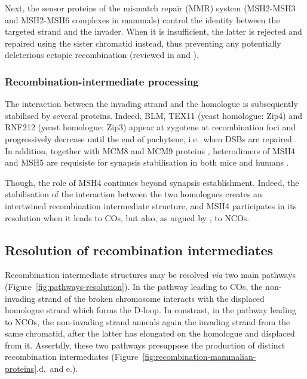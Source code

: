 Next, the sensor proteins of the mismatch repair (MMR) system (MSH2-MSH3 and MSH2-MSH6 complexes in mammals) control the identity between the targeted strand and the invader.
When it is insufficient, the latter is rejected and repaired using the sister chromatid instead, thus preventing any potentially deleterious ectopic recombination (reviewed in \citealp{surtees2004mismatch} and \citealp{goldfarb2010frequent}).


\subsubsection{Recombination-intermediate processing}
The interaction between the invading strand and the homologue is subsequently stabilised by several proteins.
Indeed, BLM, TEX11 (yeast homologue: Zip4) and RNF212 (yeast homologue: Zip3) appear at zygotene at recombination foci and progressively decrease until the end of pachytene, i.e.\ when DSBs are repaired \citep[reviewed in][]{baudat2013meiotic}. 
In addition, together with MCM8 and MCM9 proteins \citep{lutzmann2012mcm8}, heterodimers of MSH4 and MSH5 \citep{scully1997association} are requisiste for synapsis stabilisation in both mice \citep{devries1999mouse,kneitz2000muts} and humans \citep{snowden2004hmsh4hmsh5}.

Though, the role of MSH4 continues beyond synapsis establishment. 
Indeed, the stabilisation of the interaction between the two homologues creates an intertwined recombination intermediate structure, and MSH4 participates in its resolution when it leads to COs, but also, as argued by \citet{baudat2007regulating}, to NCOs.





\subsection{Resolution of recombination intermediates}
\label{chap2:resolution-intermediates}

Recombination intermediate structures may be resolved \textit{via} two main pathways (Figure~\ref{fig:pathways-resolution}).
In the pathway leading to COs, the non-invading strand of the broken chromosome interacts with the displaced homologue strand which forms the D-loop.
In constrast, in the pathway leading to NCOs, the non-invading strand anneals again the invading strand from the same chromatid, after the latter has elongated on the homologue and displaced from it.
Assertdly, these two pathways presuppose the production of distinct recombination intermediates (Figure~\ref{fig:recombination-mammalian-proteins}.d.\ and e.).


